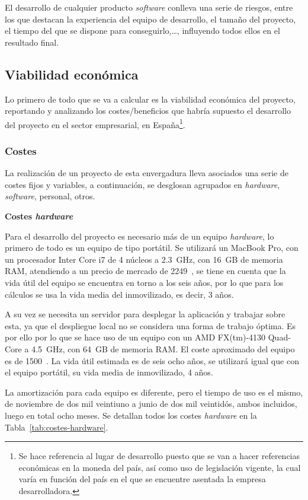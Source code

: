 El desarrollo de cualquier producto \textit{software} conlleva una serie de riesgos, entre los que destacan la experiencia del equipo de desarrollo, el tamaño del proyecto, el tiempo del que se dispone para conseguirlo,\dots, influyendo todos ellos en el resultado final.
\subsection{Viabilidad económica}
Lo primero de todo que se va a calcular es la viabilidad económica del proyecto, reportando y analizando los costes/beneficios que habría supuesto el desarrollo del proyecto en el sector empresarial, en España\footnote{Se hace referencia al lugar de desarrollo puesto que se van a hacer referencias económicas en la moneda del país, así como uso de legislación vigente, la cual varía en función del país en el que se encuentre asentada la empresa desarrolladora.}.

\subsubsection{Costes}
La realización de un proyecto de esta envergadura lleva asociados una serie de costes fijos y variables, a continuación, se desglosan agrupados en \textit{hardware}, \textit{software}, personal, otros.

\textbf{Costes \textit{hardware}}

Para el desarrollo del proyecto es necesario más de un equipo \textit{hardware}, lo primero de todo es un equipo de tipo portátil. Se utilizará un MacBook Pro, con un procesador Inter Core i7 de 4 núcleos a 2.3~GHz, con 16~GB de memoria RAM, atendiendo a un precio de mercado de 2249~\officialeuro, se tiene en cuenta que la vida útil del equipo se encuentra en torno a los seis años, por lo que para los cálculos se usa la vida media del inmovilizado, es decir, 3 años. 

A su vez se necesita un servidor para desplegar la aplicación y trabajar sobre esta, ya que el despliegue local no se considera una forma de trabajo óptima. Es por ello por lo que se hace uso de un equipo con un AMD FX(tm)-4130 Quad-Core a 4.5~GHz, con 64~GB de memoria RAM. El coste aproximado del equipo es de 1500~\officialeuro. La vida útil estimada es de seis ocho años, se utilizará igual que con el equipo portátil, su vida media de inmovilizado, 4 años.

La amortización para cada equipo es diferente, pero el tiempo de uso es el mismo, de noviembre de dos mil veintiuno a junio de dos mil veintidós, ambos incluidos, luego en total ocho meses. Se detallan todos los costes \textit{hardware} en la Tabla~\ref{tab:costes-hardware}.

